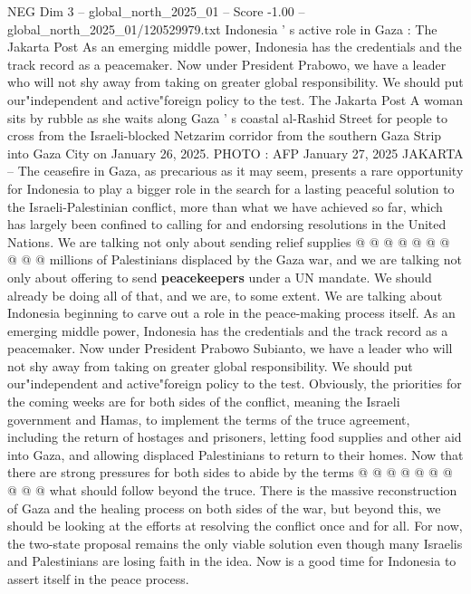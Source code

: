 \begin{textsample}{NEG Dim 3 – global\_north\_2025\_01 – Score -1.00 – global\_north\_2025\_01/120529979.txt}  \label{ex:f3_neg_211}
Indonesia ' s active role in Gaza : The Jakarta Post As an emerging middle power, Indonesia has the credentials and the track record as a peacemaker.
Now under President Prabowo, we have a leader who will not shy away from taking on greater global responsibility.
We should put our"independent and active"foreign policy to the test.
The Jakarta Post A woman sits by rubble as she waits along Gaza ' s coastal al-Rashid Street for people to cross from the Israeli-blocked Netzarim corridor from the southern Gaza Strip into Gaza City on January 26, 2025.
PHOTO : AFP January 27, 2025 JAKARTA -- The ceasefire in Gaza, as precarious as it may seem, presents a rare opportunity for Indonesia to play a bigger role in the search for a lasting peaceful solution to the Israeli-Palestinian conflict, more than what we have achieved so far, which has largely been confined to calling for and endorsing resolutions in the United Nations.
We are talking not only about sending relief supplies @ @ @ @ @ @ @ @ @ @ millions of Palestinians displaced by the Gaza war, and we are talking not only about offering to send \textbf{peacekeepers} under a UN mandate.
We should already be doing all of that, and we are, to some extent.
We are talking about Indonesia beginning to carve out a role in the peace-making process itself.
As an emerging middle power, Indonesia has the credentials and the track record as a peacemaker.
Now under President Prabowo Subianto, we have a leader who will not shy away from taking on greater global responsibility.
We should put our"independent and active"foreign policy to the test.
Obviously, the priorities for the coming weeks are for both sides of the conflict, meaning the Israeli government and Hamas, to implement the terms of the truce agreement, including the return of hostages and prisoners, letting food supplies and other aid into Gaza, and allowing displaced Palestinians to return to their homes.
Now that there are strong pressures for both sides to abide by the terms @ @ @ @ @ @ @ @ @ @ what should follow beyond the truce.
There is the massive reconstruction of Gaza and the healing process on both sides of the war, but beyond this, we should be looking at the efforts at resolving the conflict once and for all.
For now, the two-state proposal remains the only viable solution even though many Israelis and Palestinians are losing faith in the idea.
Now is a good time for Indonesia to assert itself in the peace process.

\end{textsample}
